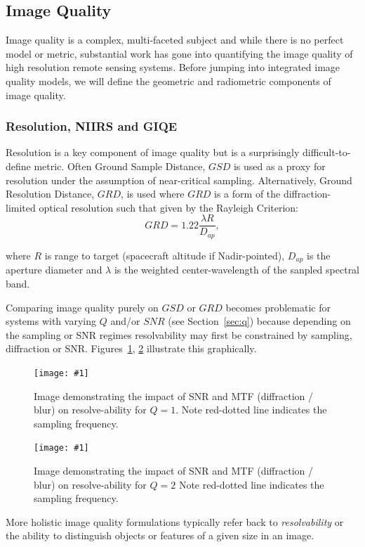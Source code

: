 \documentclass[10pt,journal]{IEEEtran}  %
\newcommand{\includefigure}[3]
{
  \begin{figure}[h!]
  \centering
  \texttt{[image: \#1]}
  \caption[]{#3}
  \label{#2}
  \end{figure}
}
\begin{document}
\subsection{Image Quality}
\label{sec:iq}

Image quality is a complex, multi-faceted subject and while there is no perfect model or metric, substantial work has gone into quantifying the image quality of high resolution remote sensing systems.  Before jumping into integrated image quality models, we will define the geometric and radiometric components of image quality.

\subsubsection{Resolution, NIIRS and GIQE}
Resolution is a key component of image quality but is a surprisingly difficult-to-define metric.  Often Ground Sample Distance, $GSD$ is used as a proxy for resolution under the assumption of near-critical sampling.
Alternatively, Ground Resolution Distance, $GRD$, is used where $GRD$ is a form of the diffraction-limited optical resolution such that given by the Rayleigh Criterion:
\begin{equation}
    GRD = 1.22 \frac{\lambda R}{D_{ap}},
\end{equation}

where $R$ is range to target (spacecraft altitude if Nadir-pointed),  $D_{ap}$ is the aperture diameter and $\lambda$ is the weighted center-wavelength of the sanpled spectral band.

Comparing image quality purely on $GSD$ or $GRD$ becomes problematic for systems with varying $Q$ and/or $SNR$ (see Section~\ref{sec:q}) because depending on the sampling or SNR regimes resolvability may first be constrained by sampling, diffraction or SNR.  Figures~\ref{fig:snr_mtf_q1}, \ref{fig:snr_mtf_q2} illustrate this graphically.

\includefigure{figures/SNR_mtf_Q1.pdf}{fig:snr_mtf_q1}{Image demonstrating the impact of SNR and MTF (diffraction / blur) on resolve-ability for $Q=1$.  Note red-dotted line indicates the sampling frequency.}

\includefigure{figures/SNR_mtf_Q2.pdf}{fig:snr_mtf_q2}{Image demonstrating the impact of SNR and MTF (diffraction / blur) on resolve-ability for $Q=2$  Note red-dotted line indicates the sampling frequency.}

More holistic image quality formulations typically refer back to \emph{resolvability} or the ability to distinguish objects or features of a given size in an image.
\end{document}
